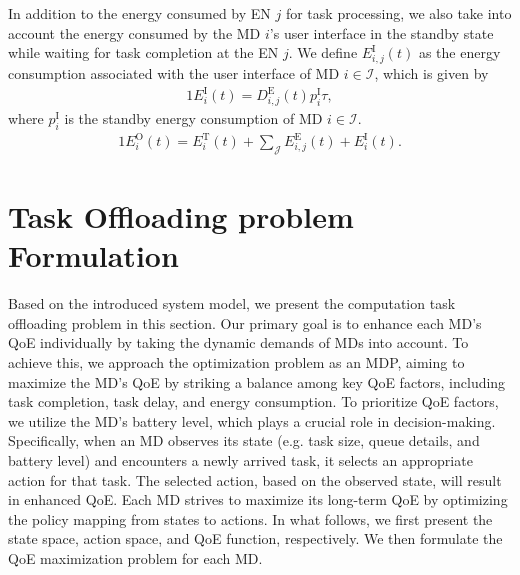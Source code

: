 \documentclass[12pt,draftclsnofoot,onecolumn]{IEEEtran}
\begin{document}
In addition to the energy consumed by EN $j$ for task processing, we also take into account the energy consumed by the MD $i$'s user interface in the standby state while waiting for task completion at the EN $j$. We define $E_{i,j}^{\text{I}}(t)$ as the energy consumption associated with the user interface of MD $i \in \mathcal{I}$, which is given by
\begin{alignat}{1}
	E_i^{\text{I}}(t) = D_{i,j}^{\text{E}}(t) p_i^{\text{I}} \tau, %
	\label{16}
\end{alignat}
where $p_i^{\text{I}}$ is the standby energy consumption of MD $i \in \mathcal{I}$.
\begin{alignat}{1}
	E_i^{\text{O}}(t) = E_i^{\text{T}}(t) + \sum_{\mathcal{J}} E_{i,j}^{\text{E}}(t) + E_i^{\text{I}}(t).
	\label{17}
\end{alignat}



\section{Task Offloading problem Formulation}
\label{section:III}

Based on the introduced system model, we present the computation task offloading problem in this section. Our primary goal is to enhance each MD's QoE individually by taking the dynamic demands of MDs into account. To achieve this, we approach the optimization problem as an MDP, aiming to maximize the MD's QoE by striking a balance among key QoE factors, including task completion, task delay, and energy consumption. To prioritize QoE factors, we utilize the MD's battery level, which plays a crucial role in decision-making. Specifically, when an MD observes its state (e.g. task size, queue details, and battery level) and encounters a newly arrived task, it selects an appropriate action for that task. The selected action, based on the observed state, will result in enhanced QoE. Each MD strives to maximize its long-term QoE by optimizing the policy mapping from states to actions. In what follows, we first present the state space, action space, and QoE function, respectively. We then formulate the QoE maximization problem for each MD.
\end{document}

